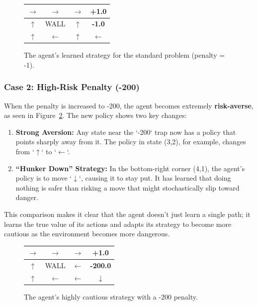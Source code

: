 \documentclass[11pt, a4paper]{article}
\begin{document}
\begin{figure}[H]
    \centering
    \begin{tabular}{|c|c|c|c|}
        \hline
        $\rightarrow$ & $\rightarrow$ & $\rightarrow$ & \textbf{+1.0} \\
        \hline
        $\uparrow$ & WALL & $\uparrow$ & \textbf{-1.0} \\
        \hline
        $\uparrow$ & $\leftarrow$ & $\uparrow$ & $\leftarrow$ \\
        \hline
    \end{tabular}
    \caption{The agent's learned strategy for the standard problem (penalty = -1).}\label{fig:policy_standard}
\end{figure}

\subsubsection{Case 2: High-Risk Penalty (-200)}
When the penalty is increased to -200, the agent becomes extremely \textbf{risk-averse}, as seen in Figure~\ref{fig:policy_high_risk}. The new policy shows two key changes:
\begin{enumerate}
    \item \textbf{Strong Aversion:} Any state near the `-200` trap now has a policy that points sharply away from it. The policy in state (3,2), for example, changes from `$\uparrow$` to `$\leftarrow$`.
    
    \item \textbf{``Hunker Down'' Strategy:} In the bottom-right corner (4,1), the agent's policy is to move `$\downarrow$`, causing it to stay put. It has learned that doing nothing is safer than risking a move that might stochastically slip toward danger.
\end{enumerate}

This comparison makes it clear that the agent doesn't just learn a single path; it learns the true value of its actions and adapts its strategy to become more cautious as the environment becomes more dangerous.

\begin{figure}[H]
    \centering
    \begin{tabular}{|c|c|c|c|}
        \hline
        $\rightarrow$ & $\rightarrow$ & $\rightarrow$ & \textbf{+1.0} \\
        \hline
        $\uparrow$ & WALL & $\leftarrow$ & \textbf{-200.0} \\
        \hline
        $\uparrow$ & $\leftarrow$ & $\leftarrow$ & $\downarrow$ \\
        \hline
    \end{tabular}
    \caption{The agent's highly cautious strategy with a -200 penalty.}\label{fig:policy_high_risk}
\end{figure}
\end{document}
